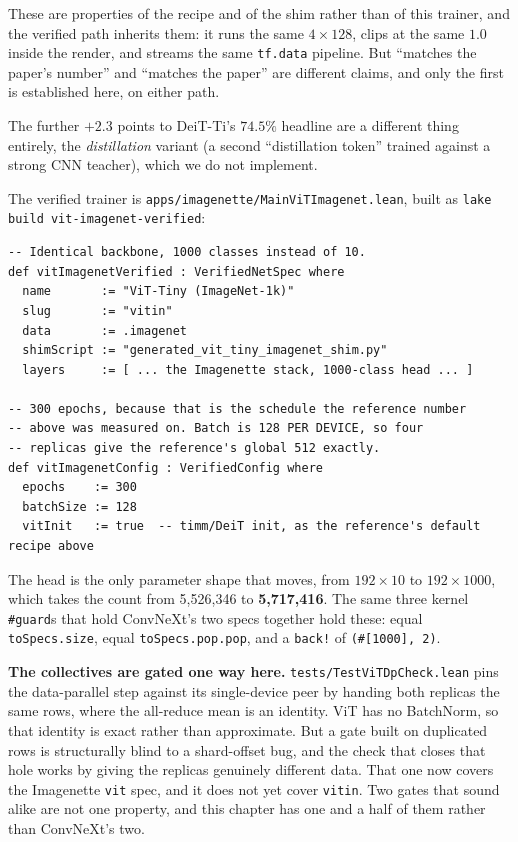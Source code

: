 \noindent These are properties of the recipe and of the shim rather
than of this trainer, and the verified path inherits them: it runs the
same $4\times128$, clips at the same $1.0$ inside the render, and streams
the same \texttt{tf.data} pipeline. But ``matches the paper's number'' and
``matches the paper'' are different claims, and only the first is
established here, on either path.

The further $+2.3$ points to DeiT-Ti's $74.5\%$ headline are a different
thing entirely, the \emph{distillation} variant (a second
``distillation token'' trained against a strong CNN teacher), which we
do not implement.

\label{sec:vit_phase4}

The verified trainer is \texttt{apps/imagenette/MainViTImagenet.lean},
built as \texttt{lake build vit-\allowbreak imagenet-\allowbreak verified}:

\begin{verbatim}
-- Identical backbone, 1000 classes instead of 10.
def vitImagenetVerified : VerifiedNetSpec where
  name       := "ViT-Tiny (ImageNet-1k)"
  slug       := "vitin"
  data       := .imagenet
  shimScript := "generated_vit_tiny_imagenet_shim.py"
  layers     := [ ... the Imagenette stack, 1000-class head ... ]

-- 300 epochs, because that is the schedule the reference number
-- above was measured on. Batch is 128 PER DEVICE, so four
-- replicas give the reference's global 512 exactly.
def vitImagenetConfig : VerifiedConfig where
  epochs    := 300
  batchSize := 128
  vitInit   := true  -- timm/DeiT init, as the reference's default recipe above
\end{verbatim}

\noindent The head is the only parameter shape that moves, from
$192 \times 10$ to $192 \times 1000$, which takes the count from
5,526,346 to \textbf{5,717,416}. The same three kernel \texttt{\#guard}s
that hold ConvNeXt's two specs together hold these: equal
\texttt{toSpecs.size}, equal \texttt{toSpecs.pop.pop}, and a
\texttt{back!} of \texttt{(\#[1000], 2)}.

\medskip\noindent\textbf{The collectives are gated one way here.}
\texttt{tests/TestViTDpCheck.lean} pins the
data-parallel step against its single-device peer by handing both
replicas the same rows, where the all-reduce mean is an
identity. ViT has no BatchNorm, so that identity is exact rather than
approximate. But a gate built on duplicated rows is structurally blind
to a shard-offset bug, and the check that closes that hole works by
giving the replicas genuinely different data. That one now covers the
Imagenette \texttt{vit} spec, and it does not yet cover \texttt{vitin}.
Two gates that sound alike are not one property, and this chapter has
one and a half of them rather than ConvNeXt's two.

